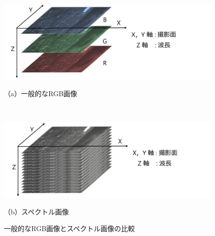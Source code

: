 \begin{figure}[p]
	\begin{center}


		\begin{minipage}[b]{\linewidth}
		\centering
		\includegraphics[width=12.5cm]{./Ch2_PrinciplesOfMethod/Fig/RGBimage_compressed.pdf}
		\vspace{-2mm}
		\caption*{（a）一般的なRGB画像} 
		\vspace{1cm} %
		\end{minipage}\\

		\begin{minipage}[b]{\linewidth}
		\centering
		\includegraphics[width=12.5cm]{./Ch2_PrinciplesOfMethod/Fig/spectralimage_compressed.pdf}
		\vspace{-2mm}
		\caption*{（b）スペクトル画像} 
		\end{minipage}
	
	\caption{一般的なRGB画像とスペクトル画像の比較}\label{fig:RGBimage_spectralimage_comparison}
	\end{center}
\end{figure}


